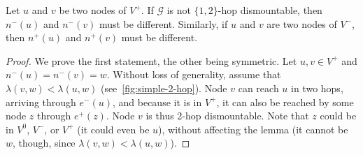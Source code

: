 \documentclass[USenglish, a4paper, thm-restate,numberwithinsect, cleveref]{lipics-v2021}
\newcommand{\G}{\ensuremath{\mathcal{G}}\xspace}
\begin{document}





\begin{lemma}\label{lem:simple-2-hop}
  Let $u$ and $v$ be two nodes of $V^+$. If $\G$ is not $\{1,2\}$-hop dismountable, then $n^-(u)$ and $n^-(v)$ must be different. Similarly, if $u$ and $v$ are two nodes of $V^-$, then $n^+(u)$ and $n^+(v)$ must be different.
\end{lemma}
\begin{proof}
  We prove the first statement, the other being symmetric.
  Let $u,v \in V^+$ and $n^-(u)=n^-(v)=w$. Without loss of generality, assume that $\lambda(v,w) < \lambda(u,w)$ (see~\cref{fig:simple-2-hop}). Node $v$ can reach $u$ in two hops, arriving through $e^-(u)$, and because it is in $V^+$, it can also be reached by some node $z$ through $e^+(z)$. Node $v$ is thus 2-hop dismountable. Note that $z$ could be in $V^0$, $V^-$, or $V^+$ (it could even be $u$), without affecting the lemma (it cannot be $w$, though, since $\lambda(v,w) < \lambda(u,w)$).
\end{proof}
\end{document}
